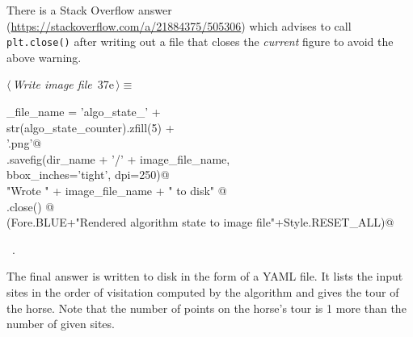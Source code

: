 \documentclass[11.5pt]{report}
\begin{document}
There is a  Stack Overflow answer (\url{https://stackoverflow.com/a/21884375/505306}) 
which advises to call \verb|plt.close()| after writing out a file that closes the 
\textit{current} figure to avoid the above warning. 

\begin{flushleft} \small\label{scrap38}\raggedright\small
{} $\langle\,${\itshape Write image file}\nobreak\ {\footnotesize {37e}}$\,\rangle\equiv$
\vspace{-1ex}
\begin{list}{}{} \item
\mbox{}\verb@image_file_name = 'algo_state_'                    +\@\\
\mbox{}\verb@                  str(algo_state_counter).zfill(5) +\@\\
\mbox{}\verb@                     '.png'@\\
\mbox{}\verb@plt.savefig(dir_name + '/' + image_file_name,  \@\\
\mbox{}\verb@            bbox_inches='tight', dpi=250)@\\
\mbox{}\verb@print "Wrote " + image_file_name + " to disk"   @\\
\mbox{}\verb@plt.close() @\\
\mbox{}\verb@debug(Fore.BLUE+"Rendered algorithm state to image file"+Style.RESET_ALL)@\\
\mbox{}\verb@@{\NWsep}
\end{list}
\vspace{-1.5ex}
\footnotesize
\begin{list}{}{\setlength{\itemsep}{-\parsep}\setlength{\itemindent}{-\leftmargin}}
\item \NWtxtMacroRefIn\ .

\item{}
\end{list}
\vspace{4ex}
\end{flushleft}
\vspace{-0.8cm}\newchunk The final answer is written to disk in the form of a YAML file. It lists the input sites 
in the order of visitation computed by the algorithm and gives the tour of the horse. 
Note that the number of points on the horse's tour is 1 more than the number of given sites. 
\end{document}

